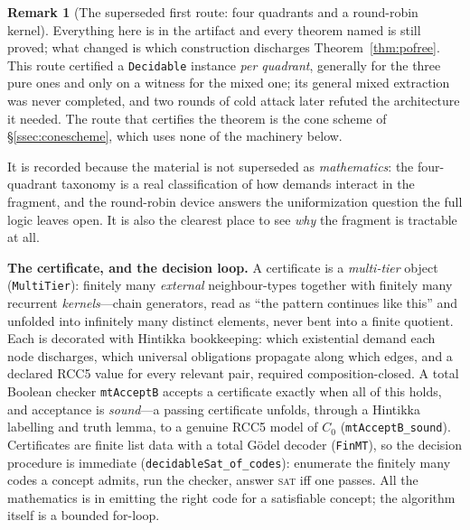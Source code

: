 \documentclass[11pt]{article}
\newcommand{\code}[1]{\texttt{#1}}
\theoremstyle{plain}
\theoremstyle{definition}
\newtheorem{remark}[theorem]{Remark}
\begin{document}
\begin{remark}[The superseded first route: four quadrants and a round-robin
kernel]\label{ssec:pofree-quadrants}
Everything here is in the artifact and every theorem named is still proved;
what changed is which construction discharges Theorem~\ref{thm:pofree}. This
route certified a \code{Decidable} instance \emph{per quadrant}, generally for
the three pure ones and only on a witness for the mixed one; its general mixed
extraction was never completed, and two rounds of cold attack later refuted the
architecture it needed. The route that certifies the theorem is the cone scheme
of \S\ref{ssec:conescheme}, which uses none of the machinery below.

It is recorded because the material is not superseded as \emph{mathematics}:
the four-quadrant taxonomy is a real classification of how demands interact in
the fragment, and the round-robin device answers the uniformization question
the full logic leaves open. It is also the clearest place to see \emph{why} the
fragment is tractable at all.

\textbf{The certificate, and the decision loop.} A certificate is a
\emph{multi-tier} object (\code{MultiTier}): finitely many \emph{external}
neighbour-types together with finitely many recurrent \emph{kernels}---chain
generators, read as ``the pattern continues like this'' and unfolded into
infinitely many distinct elements, never bent into a finite quotient. Each is
decorated with Hintikka bookkeeping: which existential demand each node
discharges, which universal obligations propagate along which edges, and a
declared RCC5 value for every relevant pair, required composition-closed. A
total Boolean checker \code{mtAcceptB} accepts a certificate exactly when all
of this holds, and acceptance is \emph{sound}---a passing certificate unfolds,
through a Hintikka labelling and truth lemma, to a genuine RCC5 model of $C_0$
(\code{mtAcceptB\_sound}). Certificates are finite list data with a total
G\"odel decoder (\code{FinMT}), so the decision procedure is immediate
(\code{decidableSat\_of\_codes}): enumerate the finitely many codes a concept
admits, run the checker, answer \textsc{sat} iff one passes. All the
mathematics is in emitting the right code for a satisfiable concept; the
algorithm itself is a bounded for-loop.


\end{remark}
\end{document}
